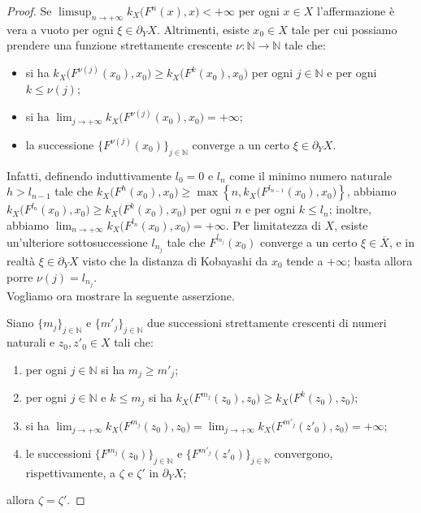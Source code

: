 \begin{proof}
    Se $\displaystyle\limsup_{n\longrightarrow+\infty}k_X\big(F^n(x),x\big)<+\infty$ per ogni $x\in X$ l'affermazione è vera a vuoto per ogni $\xi\in\partial_YX$. Altrimenti, esiste $x_0\in X$ tale per cui possiamo prendere una funzione strettamente crescente $\nu:\mathbb{N}\longrightarrow\mathbb{N}$ tale che:
    \begin{itemize}
        \item si ha $k_X\big(F^{\nu(j)}(x_0),x_0\big) \ge k_X\big(F^k(x_0),x_0\big)$ per ogni $j \in \mathbb{N}$ e per ogni $k \le \nu(j)$;
        \item si ha $\displaystyle\lim_{j\longrightarrow+\infty}k_X\big(F^{\nu(j)}(x_0),x_0\big)=+\infty$;
        \item la successione $\{F^{\nu(j)}(x_0)\}_{j\in\mathbb{N}}$ converge a un certo $\xi\in\partial_YX$.
    \end{itemize}
    
    Infatti, definendo induttivamente $l_0=0$ e $l_n$ come il minimo numero naturale $h>l_{n-1}$ tale che $k_X\big(F^h(x_0),x_0\big) \ge \max\left\{n,k_X\big(F^{l_{n-1}}(x_0),x_0\big)\right\}$, abbiamo $k_X\big(F^{l_n}(x_0),x_0\big) \ge k_X\big(F^k(x_0),x_0\big)$ per ogni $n$ e per ogni $k \le l_n$; inoltre, abbiamo $\displaystyle\lim_{n\longrightarrow+\infty}k_X\big(F^{l_n}(x_0),x_0\big)=+\infty$. Per limitatezza di $X$, esiste un'ulteriore sottosuccessione $l_{n_j}$ tale che $F^{l_{n_j}}(x_0)$ converge a un certo $\xi\in\overline{X}$, e in realtà $\xi\in\partial_YX$ visto che la distanza di Kobayashi da $x_0$ tende a $+\infty$; basta allora porre $\nu(j)=l_{n_j}$.\\

    Vogliamo ora mostrare la seguente asserzione.

    Siano $\{m_j\}_{j\in\mathbb{N}}$ e $\{m'_j\}_{j\in\mathbb{N}}$ due successioni strettamente crescenti di numeri naturali e $z_0,z'_0\in X$ tali che:
    \begin{enumerate}[label={(\arabic*)}]
        \item per ogni $j\in\mathbb{N}$ si ha $m_j \ge m'_j$;
        \item per ogni $j\in\mathbb{N}$ e $k \le m_j$ si ha $k_X\big(F^{m_j}(z_0),z_0\big) \ge k_X\big(F^k(z_0),z_0\big)$;
        \item si ha $\displaystyle\lim_{j\longrightarrow+\infty}k_X\big(F^{m_j}(z_0),z_0\big)=\lim_{j\longrightarrow+\infty}k_X\big(F^{m'_j}(z'_0),z_0\big)=+\infty$;
        \item le successioni $\{F^{m_j}(z_0)\}_{j\in\mathbb{N}}$ e $\{F^{m'_j}(z'_0)\}_{j\in\mathbb{N}}$ convergono, rispettivamente, a $\zeta$ e $\zeta'$ in $\partial_YX$;
    \end{enumerate}
    allora $\zeta=\zeta'$.


\end{proof}
